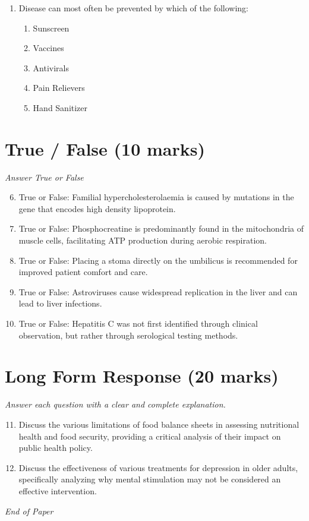 \documentclass[12pt]{article}
\begin{document}
\begin{enumerate}[label=\arabic*.]
\begin{enumerate}[label=(\alph*)]
    \item Increased risk of mortality
    \item Goitre
    \item Increased risk of obesity
    \item Increased risk of heart disease
\end{enumerate}
\item Disease can most often be prevented by which of the following:
\begin{enumerate}[label=(\alph*)]
    \item Sunscreen
    \item Vaccines
    \item Antivirals
    \item Pain Relievers
    \item Hand Sanitizer
\end{enumerate}
\end{enumerate}

\section*{True / False (10 marks)}
\textit{Answer True or False}
\begin{enumerate}[label=\arabic*.]
\setcounter{enumi}{5}
\item True or False: Familial hypercholesterolaemia is caused by mutations in the gene that encodes high density lipoprotein.
\item True or False: Phosphocreatine is predominantly found in the mitochondria of muscle cells, facilitating ATP production during aerobic respiration.
\item True or False: Placing a stoma directly on the umbilicus is recommended for improved patient comfort and care.
\item True or False: Astroviruses cause widespread replication in the liver and can lead to liver infections.
\item True or False: Hepatitis C was not first identified through clinical observation, but rather through serological testing methods.
\end{enumerate}

\section*{Long Form Response (20 marks)}
\textit{Answer each question with a clear and complete explanation.}
\begin{enumerate}[label=\arabic*.]
\setcounter{enumi}{10}
\item Discuss the various limitations of food balance sheets in assessing nutritional health and food security, providing a critical analysis of their impact on public health policy.
\item Discuss the effectiveness of various treatments for depression in older adults, specifically analyzing why mental stimulation may not be considered an effective intervention.
\end{enumerate}

\vfill
\noindent\textit{End of Paper}
\end{document}
